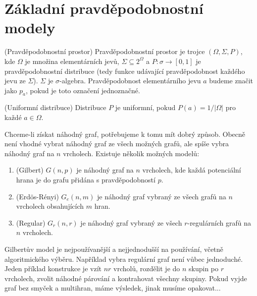 \section{Základní pravděpodobnostní modely}
\df (Pravděpodobnostní prostor) Pravděpodobnostní prostor je trojce $(\Omega,
\Sigma, P)$, kde $\Omega$ je množina elementárních jevů, $\Sigma \subseteq
2^\Omega$ a $P: \sigma \to [ 0, 1 ]$ je pravděpodobnostní distribuce (tedy
funkce udávající pravděpodobnost každého jevu ze $\Sigma$).  $\Sigma$ je
$\sigma$-algebra. Pravděpodobnost elementárního jevu $a$ budeme značit jako
$p_a$, pokud je toto označení jednoznačné.


\df (Uniformní distribuce) Distribuce $P$ je uniformní, pokud $P(a) = 1 /
|\Omega|$ pro každé $a \in \Omega$.

Chceme-li získat náhodný graf, potřebujeme k tomu mít dobrý způsob. Obecně není
vhodné vybrat náhodný graf ze všech možných grafů, ale spíše vybra náhodný graf
na $n$ vrcholech. Existuje několik možných modelů:
\begin{enumerate}
	\item (Gilbert) $G(n,p)$ je náhodný graf na $n$ vrcholech, kde každá
		potenciální hrana je do grafu přidána s pravděpodobností $p$.
	\item (Erdös-Rényi) $G_e(n,m)$ je náhodný graf vybraný ze všech grafů na $n$
		vrcholech obsahujících $m$ hran.
	\item (Regular) $G_r(n,r)$ je náhodný graf vybraný ze všech $r$-regulárních
		grafů na $n$ vrcholech.
\end{enumerate}
Gilbertův model je nejpoužívanější a nejjednodušší na používání, včetně
algoritmického výběru. Například vybra regulární graf není vůbec jednoduché.
Jeden příklad konstrukce je vzít $nr$ vrcholů, rozdělit je do $n$ skupin po $r$
vrcholech, zvolit náhodné párování a kontrahovat všechny skupiny. Pokud vyjde
graf bez smyček a multihran, máme výsledek, jinak musíme opakovat...



